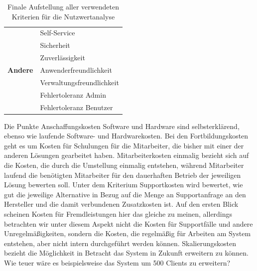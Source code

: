 \begin{table}
\begin{tabular}{l|l|}
		\cline{2-2}
		\multirow{7}{6em}{\textbf{Andere}}     & Self-Service                        \\
		~                                      & Sicherheit                          \\
		~                                      & Zuverlässigkeit                     \\
		~                                      & Anwenderfreundlichkeit              \\
		~                                      & Verwaltungsfreundlichkeit           \\
		~                                      & Fehlertoleranz Admin                \\
		~                                      & Fehlertoleranz Benutzer             \\
		\cline{2-2}
	\end{tabular}
	\caption[Finale Aufstellung aller verwendeten Kriterien für die Nutzwertanalyse]{Finale Aufstellung aller verwendeten Kriterien für die Nutzwertanalyse}
	\label{tab:Kriterien}
\end{table}

Die Punkte Anschaffungskosten Software und Hardware sind selbsterklärend, ebenso wie laufende Software- und Hardwarekosten. Bei den Fortbildungskosten geht es um Kosten für Schulungen für die Mitarbeiter, die bisher mit einer der anderen Lösungen gearbeitet haben. Mitarbeiterkosten einmalig bezieht sich auf die Kosten, die durch die Umstellung einmalig entstehen, während Mitarbeiter laufend die benötigten Mitarbeiter für den dauerhaften Betrieb der jeweiligen Lösung bewerten soll. Unter dem Kriterium Supportkosten wird bewertet, wie gut die jeweilige Alternative in Bezug auf die Menge an Supportanfrage an den Hersteller und die damit verbundenen Zusatzkosten ist. Auf den ersten Blick scheinen Kosten für Fremdleistungen hier das gleiche zu meinen, allerdings betrachten wir unter diesem Aspekt nicht die Kosten für Supportfälle und andere Unregelmäßigkeiten, sondern die Kosten, die regelmäßig für Arbeiten am System entstehen, aber nicht intern durchgeführt werden können. Skalierungskosten bezieht die Möglichkeit in Betracht das System in Zukunft erweitern zu können. Wie teuer wäre es beispielsweise das System um 500 Clients zu erweitern?

